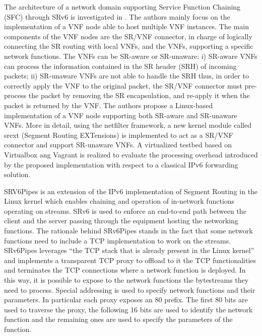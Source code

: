 The architecture of a network domain supporting Service Function Chaining (SFC) through SRv6 is investigated in \cite{implementationof}.
The authors mainly focus on the implementation of a VNF node able to host multiple VNF instances. The main components of the VNF nodes are the SR/VNF connector, in charge of logically connecting the SR routing with local VNFs, and the VNFs, supporting a specific network functions. The VNFs can be SR-aware or SR-unaware: i) SR-aware VNFs can process the
information contained in the SR header (SRH) of incoming packets; ii) SR-unaware VNFs are not able to handle the SRH thus, in order to correctly apply the VNF to the original packet, the SR/VNF connector must pre-process the packet by removing the SR encapsulation, and re-apply it when the packet is returned by the VNF.
The authors propose a Linux-based implementation of a VNF node supporting both SR-aware and SR-unaware VNFs. More in detail, using the netfilter framework, a new kernel module called srext (Segment Routing EXTensions) is implemented to act as a SR/VNF connector and support SR-unaware VNFs.
A virtualized testbed based on Virtualbox ang Vagrant is realized to evaluate the processing overhead introduced by the proposed implementation with respect to a classical IPv6 forwarding solution. %

SRV6Pipes \cite{duchene2018srv6pipes} is an extension of the IPv6 implementation of Segment Routing in the Linux kernel which enables chaining and operation of in-network functions operating on streams. SRv6 is used to enforce an end-to-end path between the client and the server passing through the equipment hosting the networking functions. 
The rationale behind SRv6Pipes stands in the fact that some network functions need to include a TCP implementation to work on the streams. SRv6Pipes leverages ``the TCP stack that is already present in the Linux kernel'' and implements a transparent TCP proxy to offload to it the TCP functionalities and terminates the TCP connections where a network function is deployed. In this way, it is possible to expose to the network functions the bytestreams they need to process. Special addressing is used to specify network functions and their parameters. In particular each proxy exposes an 80 prefix. The first 80 bits are used to traverse the proxy, the following 16 bits are used to identify the network function and the remaining ones are used to specify the parameters of the function. %

